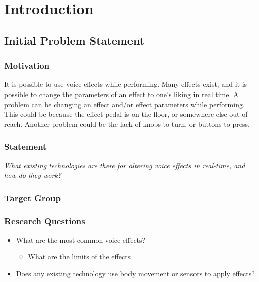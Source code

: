 \chapter{Introduction}

\section{Initial Problem Statement}

\subsection{Motivation}

It is possible to use voice effects while performing. Many effects exist, and it is possible to change the parameters of an effect to one's liking in real time. 
A problem can be changing an effect and/or effect parameters while performing. This could be because the effect pedal is on the floor, or somewhere else out of reach. Another problem could be the lack of knobs to turn, or buttons to press.

\subsection{Statement}

\textit{What existing technologies are there for altering voice effects in real-time, and how do they work?}

\subsection{Target Group}



\subsection{Research Questions}

\begin{itemize}
	\item What are the most common voice effects?
	\begin{itemize}
		\item What are the limits of the effects
	\end{itemize}
	\item Does any existing technology use body movement or sensors to apply effects?
\end{itemize}